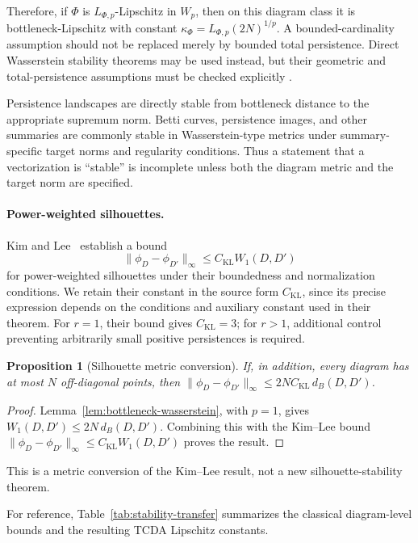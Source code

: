 \documentclass[11pt,a4paper]{article}
\theoremstyle{plain}
\newtheorem{proposition}[theorem]{Proposition}
\theoremstyle{definition}
\theoremstyle{remark}
\newcommand{\1}{\mathbbm{1}}
\begin{document}
Therefore, if \(\Phi\) is \(L_{\Phi,p}\)-Lipschitz in \(W_p\), then on this diagram class it is bottleneck-Lipschitz with constant \(\kappa_\Phi = L_{\Phi,p}(2N)^{1/p}\). A bounded-cardinality assumption should not be replaced merely by bounded total persistence. Direct Wasserstein stability theorems may be used instead, but their geometric and total-persistence assumptions must be checked explicitly
\citep{cohensteineredelsbrunnerharermileyko2010,skrabaturner2020}.

Persistence landscapes are directly stable from bottleneck distance to the appropriate supremum norm. Betti curves, persistence images, and other summaries are commonly stable in Wasserstein-type metrics under summary-specific target norms and regularity conditions. Thus a statement that a vectorization is ``stable'' is incomplete unless both
the diagram metric and the target norm are specified.

\paragraph{Power-weighted silhouettes.}
Kim and Lee~\citep[Theorem~5.3]{kimlee2026} establish a bound
\[
\|\phi_D-\phi_{D'}\|_\infty
\leq
C_{\mathrm{KL}}W_1(D,D')
\]
for power-weighted silhouettes under their boundedness and
normalization conditions. We retain their constant in the source form \(C_{\mathrm{KL}}\), since its precise expression depends on the conditions and auxiliary constant used in their theorem. For \(r=1\), their bound gives \(C_{\mathrm{KL}}=3\); for \(r>1\), additional
control preventing arbitrarily small positive persistences is required.

\begin{proposition}[Silhouette metric conversion]
\label{prop:silhouette-constant}
If, in addition, every diagram has at most \(N\)
off-diagonal points, then \(\|\phi_D-\phi_{D'}\|_\infty \leq 2NC_{\mathrm{KL}}\,d_B(D,D')\).
\end{proposition}

\begin{proof}
Lemma~\ref{lem:bottleneck-wasserstein}, with \(p=1\), gives
\(W_1(D,D')\leq2N\,d_B(D,D')\). Combining this with the
Kim--Lee bound
\(\|\phi_D-\phi_{D'}\|_\infty
\leq C_{\mathrm{KL}}W_1(D,D')\)
proves the result.
\end{proof}

This is a metric conversion of the Kim--Lee result, not a new
silhouette-stability theorem.

For reference, Table~\ref{tab:stability-transfer} summarizes the classical diagram-level bounds and the resulting TCDA Lipschitz constants.
\end{document}
